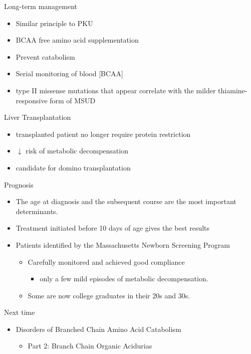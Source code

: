 \documentclass[presentation, smaller]{beamer}
\begin{document}
\begin{frame}[label={sec:orgheadline21}]{Long-term management}
\begin{itemize}
\item Similar principle to PKU
\item BCAA free amino acid supplementation
\item Prevent catabolism
\item Serial monitoring of blood [BCAA]

\item type II missense mutations that appear correlate with the milder
thiamine-responsive form of MSUD
\end{itemize}


\begin{block}{Liver Transplantation}
\begin{itemize}
\item transplanted patient no longer require protein restriction
\item \(\downarrow\) risk of metabolic decompensation
\item candidate for domino transplantation
\end{itemize}
\end{block}
\end{frame}

\begin{frame}[label={sec:orgheadline22}]{Prognosis}
\begin{itemize}
\item The age at diagnosis and the subsequent course are the most
important determinants.
\item Treatment initiated before 10 days of age gives the best results
\item Patients identified by the Massachusetts Newborn Screening Program
\begin{itemize}
\item Carefully monitored and achieved good compliance
\begin{itemize}
\item only a few mild episodes of metabolic decompensation.
\end{itemize}
\item Some are now college graduates in their 20s and 30s.
\end{itemize}
\end{itemize}
\end{frame}
\begin{frame}[label={sec:orgheadline23}]{Next time}
\begin{itemize}
\item Disorders of Branched Chain Amino Acid Catabolism
\begin{itemize}
\item Part 2: Branch Chain Organic Acidurias
\end{itemize}
\end{itemize}
\end{frame}
\end{document}
